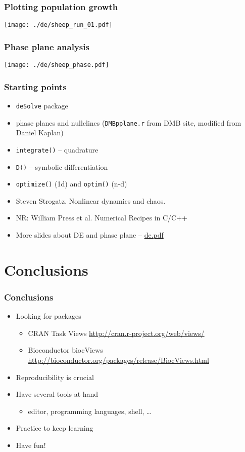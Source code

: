 \documentclass{beamer}
\begin{document}
\begin{frame}
\frametitle{Plotting population growth}
\label{sec-7-5}


\texttt{[image: ./de/sheep\_run\_01.pdf]}
\end{frame}
\begin{frame}
\frametitle{Phase plane analysis}
\label{sec-7-6}


\texttt{[image: ./de/sheep\_phase.pdf]}
\end{frame}
\begin{frame}
\frametitle{Starting points}
\label{sec-7-7}


\begin{itemize}
\item \texttt{deSolve} package
\item phase planes and nullclines (\texttt{DMBpplane.r} from DMB site, modified
     from Daniel Kaplan)
\item \texttt{integrate()}  -- quadrature
\item \texttt{D()} -- symbolic differentiation
\item \texttt{optimize()} (1d) and \texttt{optim()} (n-d)
\item Steven Strogatz.  Nonlinear dynamics and chaos.
\item NR: William Press et al.  Numerical Recipes in C/C++
\item More slides about DE and phase plane -- \url{de.pdf}
\end{itemize}
\end{frame}
\section{Conclusions}
\label{sec-8}
\begin{frame}
\frametitle{Conclusions}
\label{sec-8-1}


\begin{itemize}
\item Looking for packages
\begin{itemize}
\item CRAN Task Views \href{http://cran.r-project.org/web/views/}{http://cran.r-project.org/web/views/}
\item Bioconductor biocViews \href{http://bioconductor.org/packages/release/BiocViews.html}{http://bioconductor.org/packages/release/BiocViews.html}
\end{itemize}
\end{itemize}


\begin{itemize}
\item Reproducibility is crucial
\item Have several tools at hand
\begin{itemize}
\item editor, programming languages, shell, \ldots{}
\end{itemize}
\item Practice to keep learning
\item Have fun! \smiley{}
\end{itemize}
\end{frame}
\end{document}
